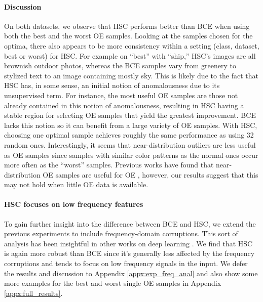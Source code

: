 \documentclass[10pt]{article} \usepackage[accepted]{stylefiles/tmlr}
\begin{document}
\paragraph{Discussion}
On both datasets, we observe that HSC performs better than BCE when using both the best and the worst OE samples. 
Looking at the samples chosen for the optima, there also appears to be more consistency within a setting (class, dataset, best or worst) for HSC. 
For example on ``best'' with ``ship,'' HSC's images are all brownish outdoor photos, whereas the BCE samples vary from greenery to stylized text to an image containing mostly sky. 
This is likely due to the fact that HSC has, in some sense, an initial notion of anomalousness due to its unsupervised term.
For instance, the most useful OE samples are those not already contained in this notion of anomalousness, resulting in HSC having a stable region for selecting OE samples that yield the greatest improvement.
BCE lacks this notion so it can benefit from a large variety of OE samples.
With HSC, choosing one optimal sample achieves roughly the same performance as using 32 random ones.
Interestingly, it seems that near-distribution outliers are less useful as OE samples since samples with similar color patterns as the normal ones occur more often as the ``worst'' samples. 
Previous works have found that near-distribution OE samples are useful for OE \citep{lee2018training,goyal2020drocc}, however, our results suggest that this may not hold when little OE data is available.


 
\paragraph{HSC focuses on low frequency features}
To gain further insight into the difference between BCE and HSC, we extend the previous experiments to include frequency-domain corruptions. 
This sort of analysis has been insightful in other works on deep learning \citep{yin2019fourier}. 
We find that HSC is again more robust than BCE since it's generally less affected by the frequency corruptions and tends to focus on low frequency signals in the input. 
We defer the results and discussion to Appendix \ref{appx:exp_freq_anal} and also show some more examples for the best and worst single OE samples in Appendix \ref{appx:full_results}.
\end{document}
